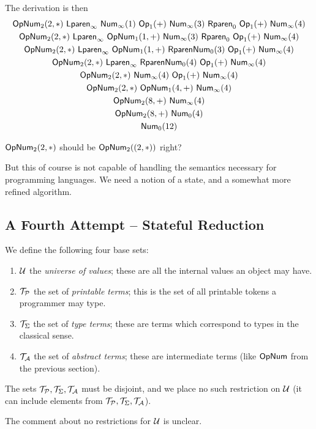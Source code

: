 \documentclass{llncs}
\newcounter{algo}
\newcommand{\yoni}[1]{{\begin{mdframed}[linecolor=red]{\color{red}#1}\end{mdframed}}}
\begin{document}
\begin{example}
    The derivation is then
    \begin{gather*}
        \OP\NUM_2(2,*)\ \LPAREN_\infty\ \NUM_\infty(1)\ \OP_1(+)\ \NUM_\infty(3)\ \RPAREN_0\ \OP_1(+)\ \NUM_\infty(4) \\
        \OP\NUM_2(2,*)\ \LPAREN_\infty\ \OP\NUM_1(1,+)\ \NUM_\infty(3)\ \RPAREN_0\ \OP_1(+)\ \NUM_\infty(4) \\
        \OP\NUM_2(2,*)\ \LPAREN_\infty\ \OP\NUM_1(1,+)\ \RPAREN\NUM_0(3)\ \OP_1(+)\ \NUM_\infty(4) \\
        \OP\NUM_2(2,*)\ \LPAREN_\infty\ \RPAREN\NUM_0(4)\ \OP_1(+)\ \NUM_\infty(4) \\
        \OP\NUM_2(2,*)\ \NUM_\infty(4)\ \OP_1(+)\ \NUM_\infty(4) \\
        \OP\NUM_2(2,*)\ \OP\NUM_1(4,+)\ \NUM_\infty(4) \\
        \OP\NUM_2(8,+)\ \NUM_\infty(4) \\
        \OP\NUM_2(8,+)\ \NUM_0(4) \\
        \NUM_0(12)
    \end{gather*}
\yoni{$\mathsf{Op}\mathsf{Num}_2(2,*)$ should be $\mathsf{Op}\mathsf{Num}_2((2,*))$ right?}

\end{example}
But this of course is not capable of handling the semantics necessary for programming languages.
We need a notion of a state, and a somewhat more refined algorithm.

\subsection{A Fourth Attempt -- Stateful Reduction}

We define the following four base sets:
\begin{enumerate}
    \item $\mathcal U$ the \textit{universe of values}; these are all the internal values an object may have.
    \item $\mathcal T_{\mathcal P}$ the set of \textit{printable terms}; this is the set of all printable tokens a programmer may type.
    \item $\mathcal T_{\Sigma}$ the set of \textit{type terms}; these are terms which correspond to types in the classical sense.
    \item $\mathcal T_{\mathcal A}$ the set of \textit{abstract terms}; these are intermediate terms (like $\mathsf{Op}\mathsf{Num}$ from the previous section).
\end{enumerate}
The sets $\mathcal T_{\mathcal P},\mathcal T_{\Sigma},\mathcal T_{\mathcal A}$ must be disjoint, and we place no such restriction on $\mathcal U$ (it can include elements from $\mathcal T_{\mathcal P},\mathcal T_{\Sigma},\mathcal T_{\mathcal A}$).
\yoni{The comment about no restrictions for $\mathcal U$ is unclear.}
\end{document}
